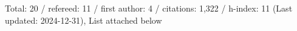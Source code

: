 Total: 20 / refereed: 11 / first author: 4 / citations: 1,322 / h-index: 11 (Last updated: 2024-12-31), List attached below